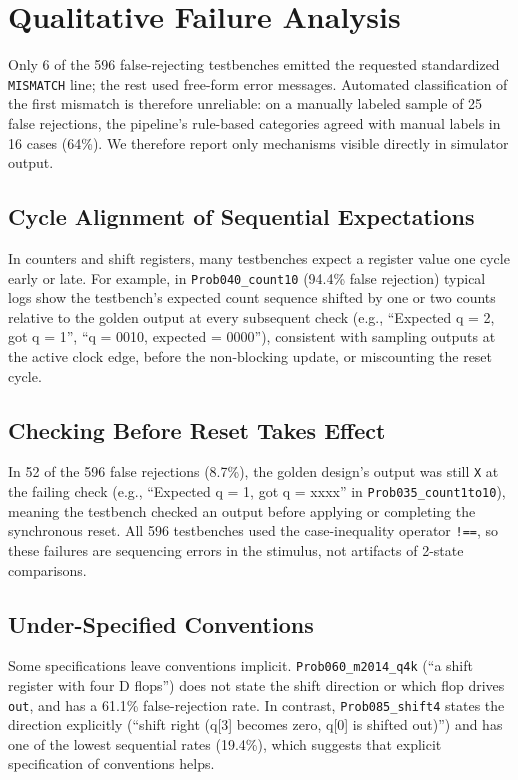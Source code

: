 \documentclass[conference]{IEEEtran}
\begin{document}
\section{Qualitative Failure Analysis}
Only 6 of the 596 false-rejecting testbenches emitted the requested standardized \texttt{MISMATCH} line; the rest used free-form error messages. Automated classification of the first mismatch is therefore unreliable: on a manually labeled sample of 25 false rejections, the pipeline's rule-based categories agreed with manual labels in 16 cases (64\%). We therefore report only mechanisms visible directly in simulator output.

\subsection{Cycle Alignment of Sequential Expectations}
In counters and shift registers, many testbenches expect a register value one cycle early or late. For example, in \texttt{Prob040\_count10} (94.4\% false rejection) typical logs show the testbench's expected count sequence shifted by one or two counts relative to the golden output at every subsequent check (e.g., ``Expected q = 2, got q = 1'', ``q = 0010, expected = 0000''), consistent with sampling outputs at the active clock edge, before the non-blocking update, or miscounting the reset cycle.

\subsection{Checking Before Reset Takes Effect}
In 52 of the 596 false rejections (8.7\%), the golden design's output was still \texttt{X} at the failing check (e.g., ``Expected q = 1, got q = xxxx'' in \texttt{Prob035\_count1to10}), meaning the testbench checked an output before applying or completing the synchronous reset. All 596 testbenches used the case-inequality operator \texttt{!==}, so these failures are sequencing errors in the stimulus, not artifacts of 2-state comparisons.

\subsection{Under-Specified Conventions}
Some specifications leave conventions implicit. \texttt{Prob060\_m2014\_q4k} (``a shift register with four D flops'') does not state the shift direction or which flop drives \texttt{out}, and has a 61.1\% false-rejection rate. In contrast, \texttt{Prob085\_shift4} states the direction explicitly (``shift right (q[3] becomes zero, q[0] is shifted out)'') and has one of the lowest sequential rates (19.4\%), which suggests that explicit specification of conventions helps.
\end{document}

